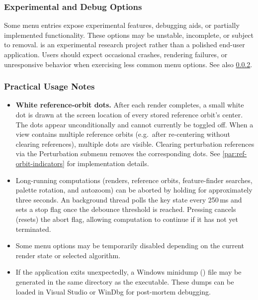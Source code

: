 \subsubsection{Experimental and Debug Options}
\label{subsec:experimental-debug}

Some menu entries expose experimental features, debugging aids, or partially
implemented functionality. These options may be unstable, incomplete, or
subject to removal. \FractalShark{} is an experimental research project rather than
a polished end-user application. Users should expect occasional crashes,
rendering failures, or unresponsive behavior when exercising less common menu
options.  See also \cref{subsec:practical-usage}.

\subsubsection{Practical Usage Notes}
\label{subsec:practical-usage}

\begin{itemize}
  \item \textbf{White reference-orbit dots.}  After each render completes, a
  small white dot is drawn at the screen location of every stored reference
  orbit's center.  The dots appear unconditionally and cannot currently be
  toggled off.  When a view contains multiple reference orbits (e.g.\ after
  re-centering without clearing references), multiple dots are visible.
  Clearing perturbation references via the Perturbation submenu removes the
  corresponding dots.  See \cref{par:ref-orbit-indicators} for implementation
  details.
  \item Long-running computations (renders, reference orbits, feature-finder
  searches, palette rotation, and autozoom) can be aborted by holding
   for approximately three seconds.  An 
  background thread polls the key state every 250\,ms and sets a stop flag once
  the debounce threshold is reached.  Pressing  cancels (resets)
  the abort flag, allowing computation to continue if it has not yet
  terminated.
  \item Some menu options may be temporarily disabled depending on the current
  render state or selected algorithm.
  \item If the application exits unexpectedly, a Windows minidump
  () file may be generated in the same directory as the
  executable.  These dumps can be loaded in Visual Studio or WinDbg for
  post-mortem debugging.
\end{itemize}

